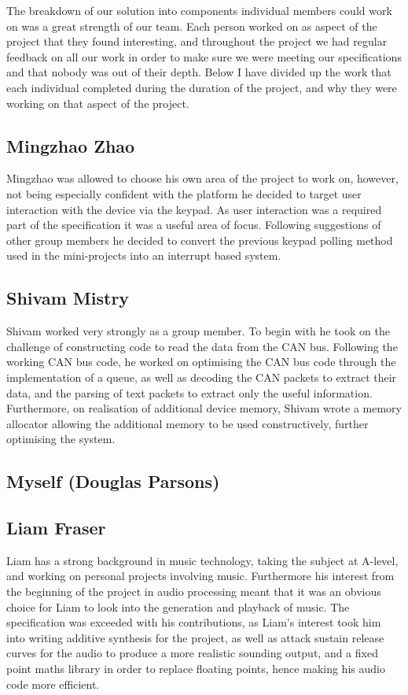 The breakdown of our solution into components individual members could work on 
was a great strength of our team. Each person worked on as aspect of the project 
that they found interesting, and throughout the project we had regular feedback 
on all our work in order to make sure we were meeting our specifications and 
that nobody was out of their depth. Below I have divided up the work that each 
individual completed during the duration of the project, and why they were 
working on that aspect of the project. 

\subsection*{Mingzhao Zhao}
Mingzhao was allowed to choose his own area of the project to work on, however, 
not being especially confident with the platform he decided to target user 
interaction with the device via the keypad. As user interaction was a required 
part of the specification it was a useful area of focus. Following suggestions 
of other group members he decided to convert the previous keypad polling method 
used in the mini-projects into an interrupt based system. 

\subsection*{Shivam Mistry} 
Shivam worked very strongly as a group member. To begin with he took on the 
challenge of constructing code to read the data from the CAN bus. Following the 
working CAN bus code, he worked on optimising the CAN bus code through the
implementation of a queue, as well as decoding the CAN packets to extract their
data, and the parsing of text packets to extract only the useful information. 
Furthermore, on realisation of additional device memory, Shivam wrote a memory 
allocator allowing the additional memory to be used constructively, further 
optimising the system. 

\subsection*{Myself (Douglas Parsons)}


\subsection*{Liam Fraser}
Liam has a strong background in music technology, taking the subject at A-level,
and working on personal projects involving music. Furthermore his interest from 
the beginning of the project in audio processing meant that it was an obvious 
choice for Liam to look into the generation and playback of music. The 
specification was exceeded with his contributions, as Liam's interest took him 
into writing additive synthesis for the project, as well as attack sustain release 
curves for the audio to produce a more realistic sounding output, and a fixed 
point maths library in order to replace floating points, hence making his audio 
code more efficient. 

